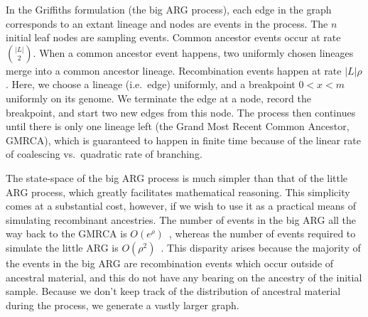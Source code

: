 \documentclass{article}
\begin{document}
In the Griffiths formulation (the big ARG process), each edge in the graph corresponds to an extant
lineage and nodes are events in the process. The $n$ initial leaf nodes are
sampling events. Common ancestor events occur at rate $\binom{|L|}{2}$.
When a common ancestor event happens, two uniformly chosen lineages
merge into a common ancestor lineage.
Recombination events happen at rate $|L| \rho$. Here, we choose a lineage (i.e.\ edge) uniformly,
and a breakpoint $0 < x < m$ uniformly on its genome. We terminate the edge at a
node, record the breakpoint, and start two new edges from this node. The process
then continues until there is only one lineage left (the Grand Most Recent
Common Ancestor, GMRCA), which is guaranteed to
happen in finite time because of the linear rate of coalescing vs.\ quadratic rate of branching.

The state-space of the big ARG process is much simpler than that of the little ARG process,
which greatly facilitates mathematical reasoning. This simplicity comes at a
substantial cost, however, if we wish to use it as a practical means of
simulating recombinant ancestries.
The number of events in the big ARG all the way back to the GMRCA
is $O(e^\rho)$~\citep{griffiths1997ancestral}, whereas the number
of events required to simulate the little ARG is
$O(\rho^2)$~\citep{hein2004gene,baumdicker2021efficient}.
This disparity arises because the majority of the events in the big ARG are
recombination events which occur outside of ancestral material,
and this do not have any bearing on the ancestry of the initial sample.
Because we don't keep track of the distribution of ancestral material during the process,
we generate a vastly larger graph.
\end{document}
